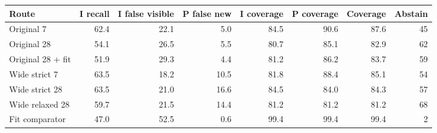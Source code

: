 \begin{tabular}{lrrrrrrr}
\toprule
Route & I recall & I false visible & P false new & I coverage & P coverage & Coverage & Abstain \\
\midrule
Original 7 & 62.4 & 22.1 & 5.0 & 84.5 & 90.6 & 87.6 & 45 \\
Original 28 & 54.1 & 26.5 & 5.5 & 80.7 & 85.1 & 82.9 & 62 \\
Original 28 + fit & 51.9 & 29.3 & 4.4 & 81.2 & 86.2 & 83.7 & 59 \\
Wide strict 7 & 63.5 & 18.2 & 10.5 & 81.8 & 88.4 & 85.1 & 54 \\
Wide strict 28 & 63.5 & 21.0 & 16.6 & 84.5 & 84.0 & 84.3 & 57 \\
Wide relaxed 28 & 59.7 & 21.5 & 14.4 & 81.2 & 81.2 & 81.2 & 68 \\
Fit comparator & 47.0 & 52.5 & 0.6 & 99.4 & 99.4 & 99.4 & 2 \\
\bottomrule
\end{tabular}
